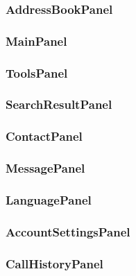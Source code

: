 \subsubsection{AddressBookPanel}

\subsubsection{MainPanel}

\subsubsection{ToolsPanel}

\subsubsection{SearchResultPanel}

\subsubsection{ContactPanel}

\subsubsection{MessagePanel}

\subsubsection{LanguagePanel}

\subsubsection{AccountSettingsPanel}

\subsubsection{CallHistoryPanel}


